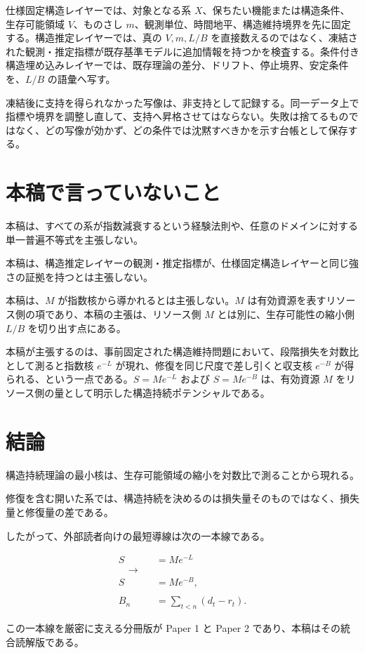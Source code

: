 \documentclass[12pt,a4paper]{article}
\begin{document}
仕様固定構造レイヤーでは、対象となる系 \(X\)、保ちたい機能または構造条件、生存可能領域 \(V\)、ものさし \(m\)、観測単位、時間地平、構造維持境界を先に固定する。構造推定レイヤーでは、真の \(V,m,L/B\) を直接数えるのではなく、凍結された観測・推定指標が既存基準モデルに追加情報を持つかを検査する。条件付き構造埋め込みレイヤーでは、既存理論の差分、ドリフト、停止境界、安定条件を、\(L/B\) の語彙へ写す。

凍結後に支持を得られなかった写像は、非支持として記録する。同一データ上で指標や境界を調整し直して、支持へ昇格させてはならない。失敗は捨てるものではなく、どの写像が効かず、どの条件では沈黙すべきかを示す台帳として保存する。

\section{本稿で言っていないこと}\label{ux672cux7a3fux3067ux8a00ux3063ux3066ux3044ux306aux3044ux3053ux3068}

本稿は、すべての系が指数減衰するという経験法則や、任意のドメインに対する単一普遍不等式を主張しない。

本稿は、構造推定レイヤーの観測・推定指標が、仕様固定構造レイヤーと同じ強さの証拠を持つとは主張しない。

本稿は、\(M\) が指数核から導かれるとは主張しない。\(M\) は有効資源を表すリソース側の項であり、本稿の主張は、リソース側 \(M\) とは別に、生存可能性の縮小側 \(L/B\) を切り出す点にある。

本稿が主張するのは、事前固定された構造維持問題において、段階損失を対数比として測ると指数核 \(e^{-L}\) が現れ、修復を同じ尺度で差し引くと収支核 \(e^{-B}\) が得られる、という一点である。\(S=Me^{-L}\) および \(S=Me^{-B}\) は、有効資源 \(M\) をリソース側の量として明示した構造持続ポテンシャルである。

\section{結論}\label{ux7d50ux8ad6}

構造持続理論の最小核は、生存可能領域の縮小を対数比で測ることから現れる。

修復を含む開いた系では、構造持続を決めるのは損失量そのものではなく、損失量と修復量の差である。

したがって、外部読者向けの最短導線は次の一本線である。

\[
\begin{aligned}
S&=Me^{-L} \\
\quad\longrightarrow\quad \\
S&=Me^{-B}, \\
\qquad \\
B_{n}&=\sum_{t<n}(d_{t}-r_{t}).
\end{aligned}
\]

この一本線を厳密に支える分冊版が Paper 1 と Paper 2 であり、本稿はその統合読解版である。
\end{document}
